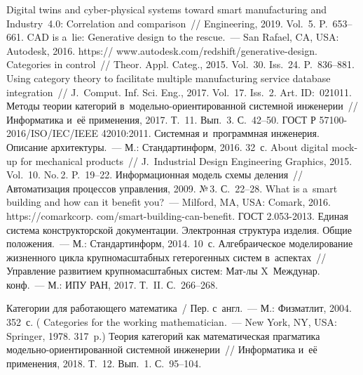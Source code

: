 \begin{multicols}{2}

{\small\frenchspacing
{%
\begin{thebibliography}{99}


 Digital twins and cyber-physical 
systems toward smart manufacturing and Industry~4.0: Correlation and comparison~// 
Engineering, 2019. Vol.~5. P.~653--661.
 CAD is a~lie: Generative design to the rescue.~--- San Rafael, CA, 
USA: Autodesk, 2016. {\sf https:// www.autodesk.com/redshift/generative-design}.
 Categories in control~// Theor. Appl. 
Categ., 2015. Vol.~30. Iss.~24. P.~836--881.
 Using 
category theory to facilitate multiple manufacturing service database integration~// 
J.~Comput. Inf. Sci. Eng., 2017. Vol.~17. Iss.~2. Art. 
ID:~021011.
 Методы теории категорий  
в~мо\-дель\-но-ори\-ен\-ти\-ро\-ван\-ной системной инженерии~// Информатика 
и~её применения, 2017. Т.~11. Вып.~3. С.~42--50.
ГОСТ Р 57100-2016/ISO/IEC/IEEE 42010:2011. Сис\-тем\-ная и~программная 
инженерия. Описание архитектуры.~--- М.: Стандартинформ, 2016. 32~с.
 About digital mock-up for mechanical 
products~// J.~Industrial Design Engineering Graphics, 2015. Vol.~10. No.\,2. 
P.~19--22.
Информационная модель схемы деления~// Автоматизация процессов 
управления, 2009. №\,3. С.~22--28.
What is a~smart building and how can it benefit you?~--- Milford, MA, USA: 
Comark, 2016. {\sf https://comarkcorp. com/smart-building-can-benefit.}
ГОСТ 2.053-2013. Единая система конструкторской документации. 
Электронная структура изделия. Общие положения.~--- М.: Стандартинформ, 
2014. 10~с.
 Алгебраическое моделирование жизненного цикла 
круп\-но\-мас\-штаб\-ных гетерогенных сис\-тем в~аспектах~// Управление развитием 
круп\-но\-мас\-штаб\-ных сис\-тем: Мат-лы X~Междунар. 
конф.~--- М.: ИПУ РАН, 2017.  Т.~II. С.~266--268.

 Категории для работающего математика~/ Пер. с~англ.~--- 
М.: Физматлит, 2004. 352~с. ( Categories for the working 
mathematician.~--- New York, NY, USA: Springer, 1978. 317~p.)
 Теория категорий как математическая прагматика  
мо\-дель\-но-ори\-ен\-ти\-ро\-ван\-ной сис\-тем\-ной инженерии~// Информатика 
и~её применения, 2018. Т.~12. Вып.~1. С.~95--104.


\end{thebibliography}}}
\end{multicols}
